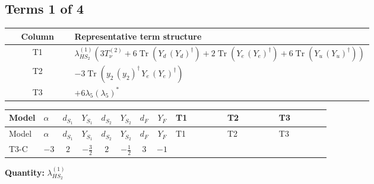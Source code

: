 \documentclass[8pt]{article}
\begin{document}
\begin{landscape}
\subsection*{Terms 1 of 4}
\begin{center}
\begin{tabular}{@{}c >{\raggedright\arraybackslash}p{0.82\linewidth}@{}}
\toprule
Column & Representative term structure \\
\midrule
T1 & \(\displaystyle {\lambda_{HS_2}^{(1)}} (3 T_{\nu}^{(2)}+6 \operatorname{Tr}\!\left({Y_d}\,\left({Y_d}\right)^{\dagger}\right)+2 \operatorname{Tr}\!\left({Y_e}\,\left({Y_e}\right)^{\dagger}\right)+6 \operatorname{Tr}\!\left({Y_u}\,\left({Y_u}\right)^{\dagger}\right))\) \\
\midrule
T2 & \(\displaystyle -3 \operatorname{Tr}\!\left({y_2}\,\left({y_2}\right)^{\dagger}\,{Y_e}\,\left({Y_e}\right)^{\dagger}\right)\) \\
\midrule
T3 & \(\displaystyle +6 {\lambda_5} \left({\lambda_5}\right)^{*}\) \\
\midrule
\bottomrule
\end{tabular}
\end{center}
\smallskip
\tiny
\begin{longtable}{@{}llcccccc >{\raggedright\arraybackslash}p{0.21\linewidth} >{\raggedright\arraybackslash}p{0.21\linewidth} >{\raggedright\arraybackslash}p{0.21\linewidth}@{}}
\toprule
Model & $\alpha$ & $d_{S_1}$ & $Y_{S_1}$ & $d_{S_2}$ & $Y_{S_2}$ & $d_F$ & $Y_F$ & T1 & T2 & T3 \\
\midrule
\endfirsthead
\toprule
Model & $\alpha$ & $d_{S_1}$ & $Y_{S_1}$ & $d_{S_2}$ & $Y_{S_2}$ & $d_F$ & $Y_F$ & T1 & T2 & T3 \\
\midrule
\endhead
T3-C & $-3$ & $2$ & $-\frac{3}{2}$ & $2$ & $-\frac{1}{2}$ & $3$ & $-1$ & \scriptsize\adjustbox{max width=\linewidth}{$\begin{gathered} {\lambda_{HS_2}^{(1)}} (3 T_{\nu}^{(2)}+6 \operatorname{Tr}\!\left({Y_d}\,\left({Y_d}\right)^{\dagger}\right)+2 \operatorname{Tr}\!\left({Y_e}\,\left({Y_e}\right)^{\dagger}\right)+6 \operatorname{Tr}\!\left({Y_u}\,\left({Y_u}\right)^{\dagger}\right))\end{gathered}$} & \scriptsize\adjustbox{max width=\linewidth}{$\begin{gathered} -3 \operatorname{Tr}\!\left({y_2}\,\left({y_2}\right)^{\dagger}\,{Y_e}\,\left({Y_e}\right)^{\dagger}\right)\end{gathered}$} & \scriptsize\adjustbox{max width=\linewidth}{$\begin{gathered} +6 {\lambda_5} \left({\lambda_5}\right)^{*}\end{gathered}$} \\
\midrule
\bottomrule
\end{longtable}
\clearpage
\noindent\textbf{Quantity: }$\lambda_{HS_2}^{(1)}$\par\smallskip

\end{landscape}
\end{document}
